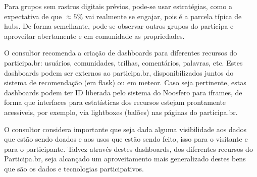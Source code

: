 \documentclass[12pt]{article}
\begin{document}
Para grupos sem rastros digitais prévios, pode-se usar estratégias, como a expectativa de que $\approx 5\%$ vai realmente se engajar, pois é a parcela típica de hubs. De forma semelhante, pode-se observar outros grupos do participa e aproveitar abertamente e em comunidade as propriedades.

O consultor recomenda a criação de dashboards para diferentes recursos do participa.br: usuários, comunidades, trilhas, comentários, palavras, etc. Estes dashboards podem ser externos ao participa.br, disponibilizados juntos do sistema de recomendação (em flask) ou em meteor. Caso seja pertinente, estas dashboards podem ter ID liberada pelo sistema do Noosfero para iframes, de forma que interfaces para estatísticas dos recursos estejam prontamente acessíveis, por exemplo, via lightboxes (balões) nas páginas do participa.br.

O consultor considera importante que seja dada alguma visibilidade aos dados que estão sendo doados e aos usos que estão sendo feito, isso para o visitante e para o participante. Talvez através destes dashboards, dos diferentes recursos do Participa.br, seja alcançado um aproveitamento mais generalizado destes bens que são os dados e tecnologias participativos.
\end{document}
